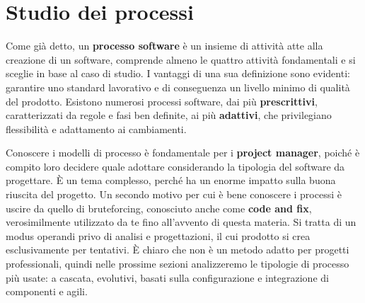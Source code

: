 \section{Studio dei processi}
Come già detto, un \textbf{processo software} è un insieme di attività atte alla creazione di un software, comprende almeno le quattro attività
fondamentali e si sceglie in base al caso di studio. I vantaggi di una sua definizione sono evidenti: garantire uno standard lavorativo e di conseguenza
un livello minimo di qualità del prodotto. Esistono numerosi processi software, dai più \textbf{prescrittivi}, caratterizzati da regole e fasi ben
definite, ai più \textbf{adattivi}, che privilegiano flessibilità e adattamento ai cambiamenti.\par
Conoscere i modelli di processo è fondamentale per i \textbf{project manager}, poiché è compito loro decidere quale adottare considerando la tipologia
del software da progettare. È un tema complesso, perché ha un enorme impatto sulla buona riuscita del progetto. Un secondo motivo per cui è bene
conoscere i processi è uscire da quello di bruteforcing, conosciuto anche come \textbf{code and fix}, verosimilmente utilizzato da te fino all'avvento
di questa materia. Si tratta di un modus operandi privo di analisi e progettazioni, il cui prodotto si crea esclusivamente per tentativi. È chiaro che
non è un metodo adatto per progetti professionali, quindi nelle prossime sezioni analizzeremo le tipologie di processo più usate: a cascata, evolutivi,
basati sulla configurazione e integrazione di componenti e agili.

%


